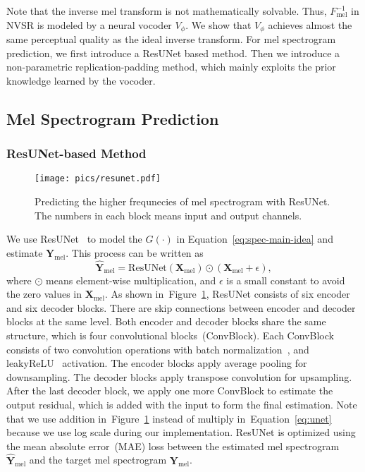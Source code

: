 \documentclass[a4paper]{article}
\def\Figref#1{Figure~\ref{#1}}
\def\Eqref#1{Equation~\ref{#1}}
\def\eps{{\epsilon}}
\def\mX{{\mathbf{X}}}
\def\mY{{\mathbf{Y}}}
\begin{document}
Note that the inverse mel transform is not mathematically solvable. Thus, $F_\text{mel}^{-1}$ in NVSR is modeled by a neural vocoder $V_{\phi}$. We show that $V_{\phi}$ achieves almost the same perceptual quality as the ideal inverse transform. For mel spectrogram prediction, we first introduce a ResUNet based method. Then we introduce a non-parametric replication-padding method, which mainly exploits the prior knowledge learned by the vocoder. 

\subsection{Mel Spectrogram Prediction}
\label{sec:mel spectrogramtrogram-prediction}








\subsubsection{ResUNet-based Method}
\label{sec:nn-method}

\begin{figure}[tbp] \centering
  \vspace{-1.6em}
  \texttt{[image: pics/resunet.pdf]}
  \caption{Predicting the higher frequnecies of mel spectrogram with ResUNet. The numbers in each block means input and output channels.}
  \label{fig-resunet-method}
\end{figure}

We use ResUNet~\cite{kong2021decoupling, liu2021cws} to model the $G(\cdot)$ in \Eqref{eq:spec-main-idea} and estimate $\mY_\text{mel}$. This process can be written as
\begin{equation}
    \label{eq:unet}
    \hat{\mY}_\text{mel} = \text{ResUNet}(\mX_\text{mel}) \odot (\mX_\text{mel} + \eps),
\end{equation}
where $\odot$ means element-wise multiplication, and $\eps$ is a small constant to avoid the zero values in $\mX_\text{mel}$. As shown in~\Figref{fig-resunet-method}, ResUNet consists of six encoder and six decoder blocks. There are skip connections between encoder and decoder blocks at the same level. Both encoder and decoder blocks share the same structure, which is four convolutional blocks~(ConvBlock). Each ConvBlock consists of two convolution operations with batch normalization~\cite{ioffe2015batch}, and leakyReLU~\cite{Maas13rectifiernonlinearities} activation. The encoder blocks apply average pooling for downsampling. The decoder blocks apply transpose convolution for upsampling. After the last decoder block, we apply one more ConvBlock to estimate the output residual, which is added with the input to form the final estimation. Note that we use addition in~\Figref{fig-resunet-method} instead of multiply in~\Eqref{eq:unet} because we use log scale during our implementation.
ResUNet is optimized using the mean absolute error~(MAE) loss between the estimated mel spectrogram $\hat{\mY}_\text{mel}$ and the target mel spectrogram $\mY_\text{mel}$.
\end{document}
